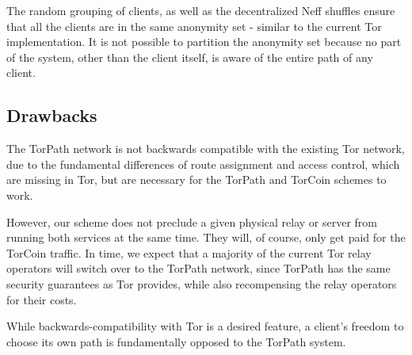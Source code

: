 The random grouping of clients, as well as the decentralized Neff shuffles ensure that all the clients are in the same anonymity set - similar to the current Tor implementation. It is not possible to partition the anonymity set because no part of the system, other than the client itself, is aware of the entire path of any client.

\subsection{Drawbacks}
The TorPath network is not backwards compatible with the existing Tor network, due to the fundamental differences of route assignment and access control, which are missing in Tor, but are necessary for the TorPath and TorCoin schemes to work.

However, our scheme does not preclude a given physical relay or server from running both services at the same time. They will, of course, only get paid for the TorCoin traffic. In time, we expect that a majority of the current Tor relay operators will switch over to the TorPath network, since TorPath has the same security guarantees as Tor provides, while also recompensing the relay operators for their costs.

While backwards-compatibility with Tor is a desired feature, a client's freedom to choose its own path is fundamentally opposed to the TorPath system.
